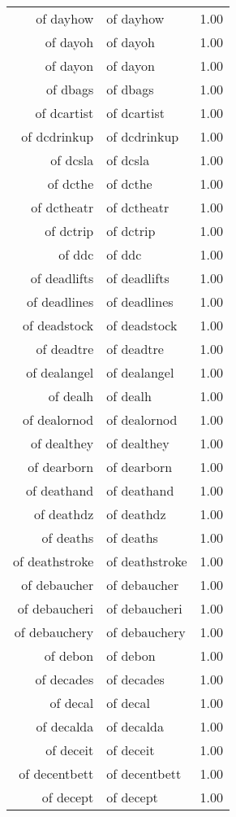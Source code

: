 \begin{table}[ht]
\begin{tabular}{rlr}
  of dayhow & of dayhow & 1.00 \\ 
  of dayoh & of dayoh & 1.00 \\ 
  of dayon & of dayon & 1.00 \\ 
  of dbags & of dbags & 1.00 \\ 
  of dcartist & of dcartist & 1.00 \\ 
  of dcdrinkup & of dcdrinkup & 1.00 \\ 
  of dcsla & of dcsla & 1.00 \\ 
  of dcthe & of dcthe & 1.00 \\ 
  of dctheatr & of dctheatr & 1.00 \\ 
  of dctrip & of dctrip & 1.00 \\ 
  of ddc & of ddc & 1.00 \\ 
  of deadlifts & of deadlifts & 1.00 \\ 
  of deadlines & of deadlines & 1.00 \\ 
  of deadstock & of deadstock & 1.00 \\ 
  of deadtre & of deadtre & 1.00 \\ 
  of dealangel & of dealangel & 1.00 \\ 
  of dealh & of dealh & 1.00 \\ 
  of dealornod & of dealornod & 1.00 \\ 
  of dealthey & of dealthey & 1.00 \\ 
  of dearborn & of dearborn & 1.00 \\ 
  of deathand & of deathand & 1.00 \\ 
  of deathdz & of deathdz & 1.00 \\ 
  of deaths & of deaths & 1.00 \\ 
  of deathstroke & of deathstroke & 1.00 \\ 
  of debaucher & of debaucher & 1.00 \\ 
  of debaucheri & of debaucheri & 1.00 \\ 
  of debauchery & of debauchery & 1.00 \\ 
  of debon & of debon & 1.00 \\ 
  of decades & of decades & 1.00 \\ 
  of decal & of decal & 1.00 \\ 
  of decalda & of decalda & 1.00 \\ 
  of deceit & of deceit & 1.00 \\ 
  of decentbett & of decentbett & 1.00 \\ 
  of decept & of decept & 1.00 \\ 

\end{tabular}
\end{table}
